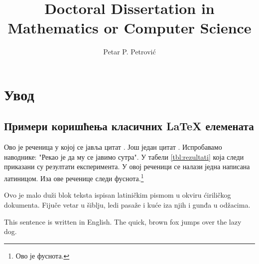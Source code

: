 \documentclass[12pt,oneside]{memoir}
\author{Petar P. Petrović}
\title{Doctoral Dissertation in Mathematics or Computer Science}
\begin{document}
\frontmatter
\naslovna
\naslovnaen
\komisija
\apstrakt
\apstrakten
\tableofcontents*

\mainmatter

\chapter{Увод}
\pangrami

\section{Примери коришћења класичних \LaTeX{} елемената}
Ово је реченица у којој се јавља цитат \cite{PetrovicMikic2015}.
Још један цитат \cite{GuSh:243}.
Испробавамо наводнике: "Рекао је да му се јавимо сутра".
У табели \ref{tbl:rezultati} која следи приказани су резултати експеримента.
У овој реченици се налази једна  написана латиницом.
Иза ове реченице следи фуснота.\footnote{Ово је фуснота.}

\begin{latinica}
  Ovo je malo duži blok teksta ispisan latiničkim pismom u okviru
  ćiriličkog dokumenta. Fijuče vetar u šiblju, ledi pasaže i kuće iza
  njih i gunđa u odžacima.
\end{latinica}

\begin{english}
  This sentence is written in English. The quick, brown fox jumps over the
  lazy dog.
\end{english}
\end{document}
